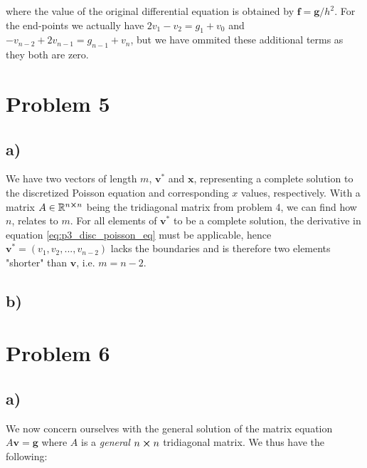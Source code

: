 \documentclass[english,notitlepage,nofootinbib]{revtex4-1}  %
\renewcommand{\vec}{\mathbf}
\begin{document}
where the value of the original differential equation is obtained by $\mathbf{f}=\mathbf{g}/h^2$. For the end-points we actually have $2v_1-v_2=g_1+v_0$ and $-v_{n-2}+2v_{n-1}=g_{n-1}+v_n$, but we have ommited these additional terms as they both are zero. 


\section*{Problem 5}
\subsection*{a)}
We have two vectors of length $m$, $\mathbf{v}^*$ and $\mathbf{x}$, representing a complete solution to the discretized Poisson equation and corresponding $x$ values, respectively. With a matrix $A\in\mathbb{R}^{n\cross n}$ being the tridiagonal matrix from problem 4, we can find how $n$, relates to $m$. For all elements of $\mathbf{v}^*$ to be a complete solution, the derivative in equation \eqref{eq:p3_disc_poisson_eq} must be applicable, hence $\vec{v}^*=(v_1, v_2, ..., v_{n-2})$ lacks the boundaries and is therefore two elements "shorter" than $\vec{v}$, i.e. $m=n-2$. 

\subsection*{b)}



\section*{Problem 6}
\subsection*{a)}
We now concern ourselves with the general solution of the matrix equation $A\vec{v} = \vec{g}$ where $A$ is a \textit{general} $n\cross n$ tridiagonal matrix. We thus have the following:
\end{document}

